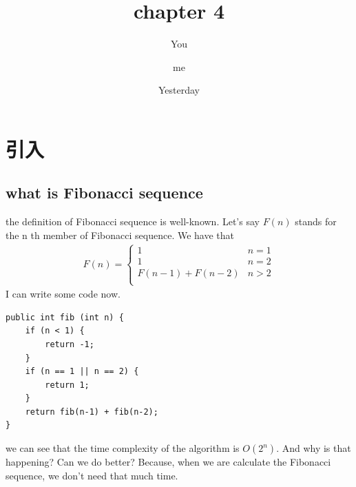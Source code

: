 \documentclass[a4paper, 10pt]{ctexart} %
\title{chapter 4}
\author{ You \and me}
\date{Yesterday}
\begin{document}
\maketitle
\tableofcontents
\section{引入}
\subsection{what is Fibonacci sequence}
the definition of Fibonacci sequence is well-known. Let's say $F \left(n\right) $ stands for the
n th member of Fibonacci sequence. We have that 
\begin{align*}
    F\left(n\right) = 
    \begin{cases}
        1 & n  =1 \\ 
        1 & n  = 2 \\
        F\left(n  -1\right) + F\left(n  -2\right)& n > 2 \\
    \end{cases}
\end{align*}
I can write some code now. 

\begin{verbatim}
public int fib (int n) {
    if (n < 1) {
        return -1;
    }
    if (n == 1 || n == 2) {
        return 1;
    }
    return fib(n-1) + fib(n-2);
}
\end{verbatim}
we can see that the time complexity of the algorithm is  $O \left( 2^{n}\right)$. 
And why is that happening? Can we do better? Because, when we are calculate the 
Fibonacci sequence, we don't need that much time.
\end{document}
